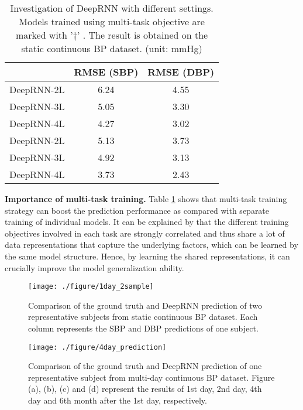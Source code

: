 \documentclass[letterpaper, 10 pt, conference]{ieeeconf}
\begin{document}
 \begin{table}[]
 \centering
 \begin{tabular}{r|c|c}
 \hline
     		 & RMSE (SBP) & RMSE (DBP) \\ \hline \hline
 DeepRNN-2L  & 6.24          & 4.55       \\ \hline
 DeepRNN-3L  & 5.05         & 3.30         \\ \hline
 DeepRNN-4L  & 4.27         & 3.02          \\ \hline 
 \hline
 DeepRNN-2L \text{\dag}  & 5.13          & 3.73      \\ \hline
 DeepRNN-3L \text{\dag}  &  4.92	 	& 3.13         \\ \hline
 DeepRNN-4L \text{\dag} & 3.73          & 2.43          \\ \hline 
 \end{tabular}
 \caption{Investigation of DeepRNN with different settings.
 Models trained using multi-task objective are marked with '$\dag$' .
  The result is obtained on the static continuous BP dataset. (unit: mmHg)}
 \label{tab:multitask}
 \end{table}
 
\textbf{Importance of multi-task training.}
Table \ref{tab:multitask} shows that multi-task training strategy can boost the prediction performance as compared with separate training of individual models.
It can be explained by that the different training objectives involved in each task are strongly correlated and thus share a lot of data representations that capture 
the underlying factors, which can be learned by the same model structure.
Hence, by learning the shared representations, it can crucially improve the model generalization ability.
\begin{figure*}
\centering
\texttt{[image: ./figure/1day\_2sample]}
\caption{Comparison of the ground truth and DeepRNN prediction of two  representative subjects from static continuous BP dataset. Each column represents the SBP and DBP predictions of one subject.}
\label{fig:1day}
\end{figure*}

\begin{figure*}
\centering
\texttt{[image: ./figure/4day\_prediction]}
\caption{Comparison of the ground truth and DeepRNN prediction of one representative subject from multi-day continuous BP dataset. Figure (a), (b), (c) and (d) represent the results of 1st day, 2nd day, 4th day and 6th month after the 1st day, respectively.}
\label{fig:2}
\end{figure*}
\end{document}
